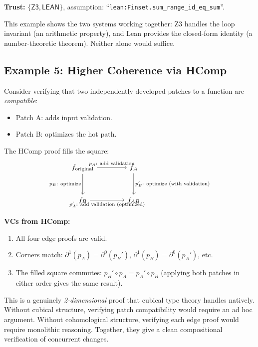 \textbf{Trust:} $\{\mathsf{Z3}, \mathsf{LEAN}\}$, assumption:
``\texttt{lean:Finset.sum\_range\_id\_eq\_sum}''.

This example shows the two systems working together: Z3 handles
the loop invariant (an arithmetic property), and Lean provides
the closed-form identity (a number-theoretic theorem).  Neither
alone would suffice.


\subsection{Example 5: Higher Coherence via HComp}
\label{sec:ex-hcomp}

Consider verifying that two independently developed patches
to a function are \emph{compatible}:
\begin{itemize}
\item Patch A: adds input validation.
\item Patch B: optimizes the hot path.
\end{itemize}

The \textsf{HComp} proof fills the square:
\[
\begin{tikzcd}[column sep=4em, row sep=3em]
  f_\text{original}
    \ar[r, "p_A\text{: add validation}"]
    \ar[d, "p_B\text{: optimize}"']
  & f_{A}
    \ar[d, "p_B'\text{: optimize (with validation)}"] \\
  f_{B}
    \ar[r, "p_A'\text{: add validation (optimized)}"']
  & f_{AB}
\end{tikzcd}
\]

\textbf{VCs from HComp:}
\begin{enumerate}
\item All four edge proofs are valid.
\item Corners match: $\partial^1(p_A) = \partial^0(p_B')$,
  $\partial^1(p_B) = \partial^0(p_A')$, etc.
\item The filled square commutes:
  $p_B' \circ p_A = p_A' \circ p_B$ (applying both patches in
  either order gives the same result).
\end{enumerate}

This is a genuinely \emph{2-dimensional} proof that cubical
type theory handles natively.  Without cubical structure,
verifying patch compatibility would require an ad hoc
argument.  Without cohomological structure, verifying each
edge proof would require monolithic reasoning.  Together,
they give a clean compositional verification of concurrent
changes.


